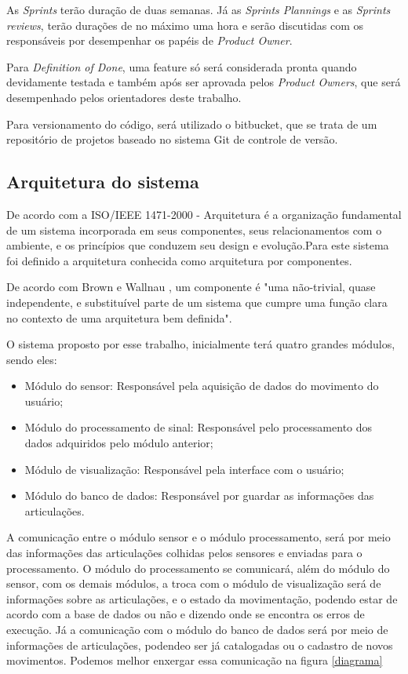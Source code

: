   As \textit{Sprints} terão duração de duas semanas. Já as \textit{Sprints Plannings}
e as \textit{Sprints reviews}, terão durações de no máximo uma hora e serão 
discutidas com os responsáveis por desempenhar os papéis de \textit{Product Owner}.

  Para \textit{Definition of Done}, uma feature só será considerada pronta quando
devidamente testada e também após ser aprovada pelos \textit{Product Owners}, que 
será desempenhado pelos orientadores deste trabalho.
  
  Para versionamento do código, será utilizado o bitbucket, que se trata de um
repositório de projetos baseado no sistema Git de controle de versão.

\subsection{Arquitetura do sistema}
\label{Sec:arquitetura}
  De acordo com a ISO/IEEE 1471-2000 - Arquitetura é a organização fundamental 
de um sistema incorporada em seus componentes, seus relacionamentos com o 
ambiente, e os princípios que conduzem seu design e evolução.Para este sistema 
foi definido a arquitetura conhecida como arquitetura por componentes.
  
  De acordo com Brown e Wallnau \cite{brownWall}, um componente é 
"uma não-trivial, quase independente, e substituível parte de um sistema que 
cumpre uma função clara no contexto de uma arquitetura bem definida".

  O sistema proposto por esse trabalho, inicialmente terá quatro grandes módulos,
 sendo eles:

  \begin{itemize}
  \item Módulo do sensor: Responsável pela aquisição de dados do movimento do 
  usuário;
  \item Módulo do processamento de sinal: Responsável pelo processamento dos dados
  adquiridos pelo módulo anterior;
  \item Módulo de visualização: Responsável pela interface com o usuário;
  \item Módulo do banco de dados: Responsável por guardar as informações das articulações.
  \end{itemize} 

  A comunicação entre o módulo sensor e o módulo processamento, será por meio 
das informações das articulações colhidas pelos sensores e enviadas para o processamento.
O módulo do processamento se comunicará, além do módulo do sensor, com os demais
módulos, a troca com o módulo de visualização será de  informações sobre as articulações,
e o estado da movimentação, podendo estar de acordo com a base de dados ou não e 
dizendo onde se encontra os erros de execução. Já a comunicação com o módulo do
banco de dados será por meio de informações de articulações, podendeo ser já catalogadas
 ou o cadastro de novos movimentos. Podemos melhor enxergar essa comunicação na 
figura \ref{diagrama}

